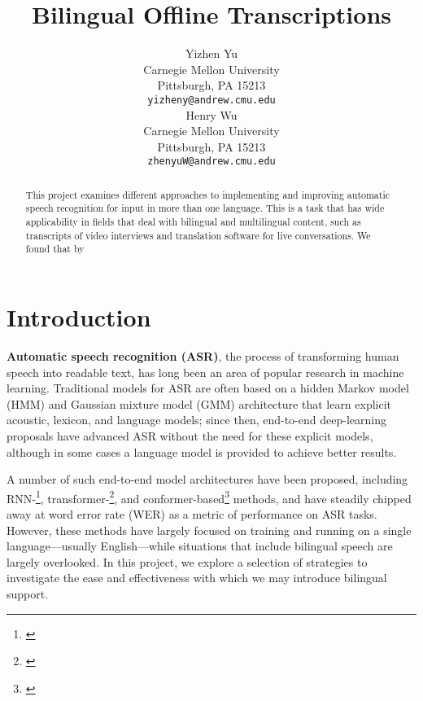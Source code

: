 \documentclass{article}
\title{Bilingual Offline Transcriptions}
\author{
  Yizhen Yu \\
  Carnegie Mellon University\\
  Pittsburgh, PA 15213 \\
  \texttt{yizheny@andrew.cmu.edu} \\\And
  Henry Wu \\
  Carnegie Mellon University \\
  Pittsburgh, PA 15213 \\
  \texttt{zhenyuW@andrew.cmu.edu}
}
\begin{document}
  \maketitle
  \begin{abstract}
    This project examines different approaches to implementing and improving automatic speech recognition for input in more than one language. This is a task that has wide applicability in fields that deal with bilingual and multilingual content, such as transcripts of video interviews and translation software for live conversations. We found that by %
  \end{abstract}
  \section{Introduction}
  \textbf{Automatic speech recognition (ASR)}, the process of transforming human speech into readable text, has long been an area of popular research in machine learning. Traditional models for ASR are often based on a hidden Markov model (HMM) and Gaussian mixture model (GMM) architecture that learn explicit acoustic, lexicon, and language models; since then, end-to-end deep-learning proposals have advanced ASR without the need for these explicit models, although in some cases a language model is provided to achieve better results.

  A number of such end-to-end model architectures have been proposed, including RNN-\footnote{\cite{Chan}}, transformer-\footnote{\cite{Vaswani}}, and conformer-based\footnote{\cite{Gulati}} methods, and have steadily chipped away at word error rate (WER) as a metric of performance on ASR tasks. However, these methods have largely focused on training and running on a single language---usually English---while situations that include bilingual speech are largely overlooked. In this project, we explore a selection of strategies to investigate the ease and effectiveness with which we may introduce bilingual support.
\end{document}
